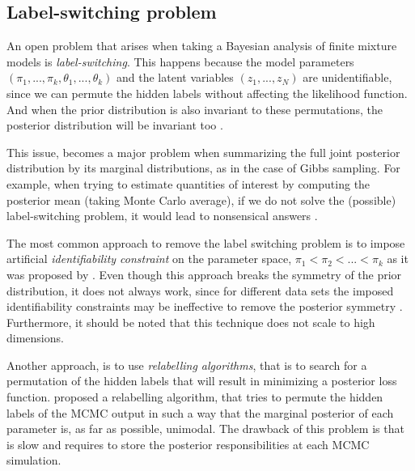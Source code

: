 \subsection{Label-switching problem} \label{fdmm-relable-subsect}
An open problem that arises when taking a Bayesian analysis of finite mixture models is \emph{label-switching}. This happens because the model parameters $(\pi_{1},...,\pi_{k},\theta_{1},...,\theta_{k})$ and the latent variables $(z_{1},...,z_{N})$ are unidentifiable, since we can permute the hidden labels without affecting the likelihood function. And when the prior distribution is also invariant to these permutations, the posterior distribution will be invariant too \citep{Rufo2006}.

This issue, becomes a major problem when summarizing the full joint posterior distribution by its marginal distributions, as in the case of Gibbs sampling. For example, when trying to estimate quantities of interest by computing the posterior mean (\ie taking Monte Carlo average), if we do not solve the (possible) label-switching problem, it would lead to nonsensical answers \citep{Stephens2000}. 

The most common approach to remove the label switching problem is to impose artificial \emph{identifiability constraint} on the parameter space, \eg $\pi_{1} < \pi_{2} < ... < \pi_{k}$ as it was proposed by \citet{Richardson1997}. Even though this approach breaks the symmetry of the prior distribution, it does not always work, since for different data sets the imposed identifiability constraints may be ineffective to remove the posterior symmetry \citep{Celeux2000}. Furthermore, it should be noted that this technique does not scale to high dimensions. 

Another approach, is to use \emph{relabelling algorithms}, that is to search for a permutation of the hidden labels that will result in minimizing a posterior loss function. \citet{Stephens2000} proposed a relabelling algorithm, that tries to permute the hidden labels of the MCMC output in such a way that the marginal posterior of each parameter is, as far as possible, unimodal. The drawback of this problem is that is slow and requires to store the posterior responsibilities at each MCMC simulation. 